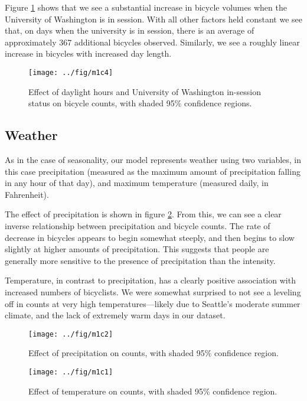 \documentclass[12pt,letterpaper,article,twocolumn]{memoir}
\begin{document}
Figure \ref{fg:seasonality} shows that we see a substantial increase
in bicycle volumes when the University of Washington is in session.
With all other factors held constant we see that, on days when the
university is in session, there is an average of approximately 367
additional bicycles observed. Similarly, we see a roughly linear
increase in bicycles with increased day length.

\begin{figure}[htbp!]
  \centering
  \texttt{[image: ../fig/m1c4]}
  \caption{Effect of daylight hours and University of Washington
    in-session status on bicycle counts, with shaded 95\% confidence
    regions.}
  \label{fg:seasonality}
\end{figure}

\FloatBarrier
\subsection*{Weather}
As in the case of seasonality, our model represents weather using two
variables, in this case precipitation (measured as the maximum amount
of precipitation falling in any hour of that day), and maximum
temperature (measured daily, in Fahrenheit).

The effect of precipitation is shown in figure \ref{fg:precipitation}.
From this, we can see a clear inverse relationship between
precipitation and bicycle counts. The rate of decrease in bicycles
appears to begin somewhat steeply, and then begins to slow slightly at
higher amounts of precipitation. This suggests that people are
generally more sensitive to the presence of precipitation than the
intensity.

Temperature, in contrast to precipitation, has a clearly positive
association with increased numbers of bicyclists. We were somewhat
surprised to not see a leveling off in counts at very high
temperatures---likely due to Seattle's moderate summer climate, and the
lack of extremely warm days in our dataset.

\begin{figure}[ht!]
  \centering
  \texttt{[image: ../fig/m1c2]}
  \caption{Effect of precipitation on counts, with shaded 95\%
    confidence region.}
  \label{fg:precipitation}
\end{figure}

\begin{figure}[ht!]
  \centering
  \texttt{[image: ../fig/m1c1]}
  \caption{Effect of temperature on counts, with shaded 95\%
    confidence region.}
  \label{fg:temperature}
\end{figure}
\end{document}
